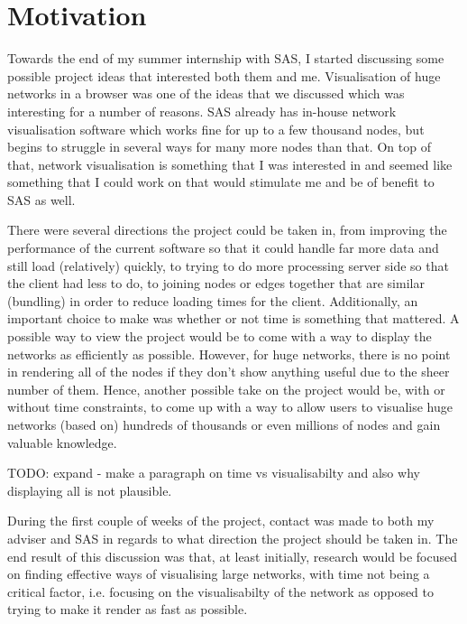 \documentclass[../dissertation.tex]{subfiles}
\begin{document}
\chapter{Motivation}

Towards the end of my summer internship with SAS, I started discussing some possible project ideas that interested both them and me. Visualisation of huge networks in a browser was one of the ideas that we discussed which was interesting for a number of reasons. SAS already has in-house network visualisation software which works fine for up to a few thousand nodes, but begins to struggle in several ways for many more nodes than that. On top of that, network visualisation is something that I was interested in and seemed like something that I could work on that would stimulate me and be of benefit to SAS as well.

There were several directions the project could be taken in, from improving the performance of the current software so that it could handle far more data and still load (relatively) quickly, to trying to do more processing server side so that the client had less to do, to joining nodes or edges together that are similar (bundling) in order to reduce loading times for the client. Additionally, an important choice to make was whether or not time is something that mattered. A possible way to view the project would be to come with a way to display the networks as efficiently as possible. However, for huge networks, there is no point in rendering all of the nodes if they don't show anything useful due to the sheer number of them. Hence, another possible take on the project would be, with or without time constraints, to come up with a way to allow users to visualise huge networks (based on) hundreds of thousands or even millions of nodes and gain valuable knowledge.

TODO: expand - make a paragraph on time vs visualisabilty and also why displaying all is not plausible. 

During the first couple of weeks of the project, contact was made to both my adviser and SAS in regards to what direction the project should be taken in. The end result of this discussion was that, at least initially, research would be focused on finding effective ways of visualising large networks, with time not being a critical factor, i.e. focusing on the visualisabilty of the network as opposed to trying to make it render as fast as possible. 
\end{document}
